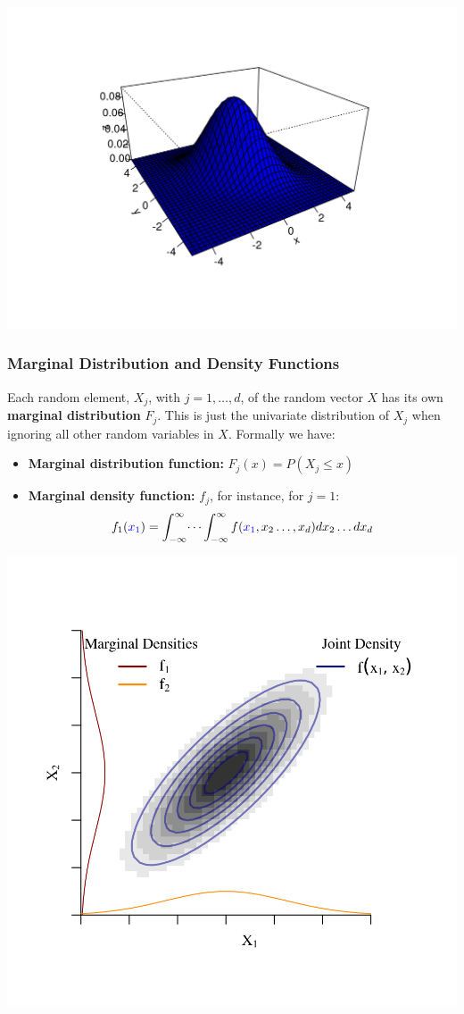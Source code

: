 \documentclass[
  14pt,
]{memoir}
\begin{document}
\begin{center}\includegraphics[width=0.8\linewidth]{figure/minimal-unnamed-chunk-38-1} \end{center}

\hypertarget{marginal-distribution-and-density-functions}{%
\subsubsection{Marginal Distribution and Density Functions}\label{marginal-distribution-and-density-functions}}

Each random element, \(X_j\), with \(j=1,\dots,d\), of the random vector \(X\) has its own \textbf{marginal distribution} \(F_j\). This is just the univariate distribution of \(X_j\) when ignoring all other random variables in \(X\). Formally we have:

\begin{itemize}
\item \textbf{Marginal distribution function:} $F_j(x)=P(X_j\leq x)$
\item \textbf{Marginal density function:} $f_j$, for instance, for $j=1$:
$$f_1({\color{blue}x_1})=\int_{-\infty}^{\infty}\dots \int_{-\infty}^{\infty}f({\color{blue}x_1},x_2\dots,
x_d)dx_2\dots  dx_d$$
\end{itemize}

\begin{center}\includegraphics[width=0.8\linewidth]{figure/minimal-unnamed-chunk-39-1} \end{center}
\end{document}
